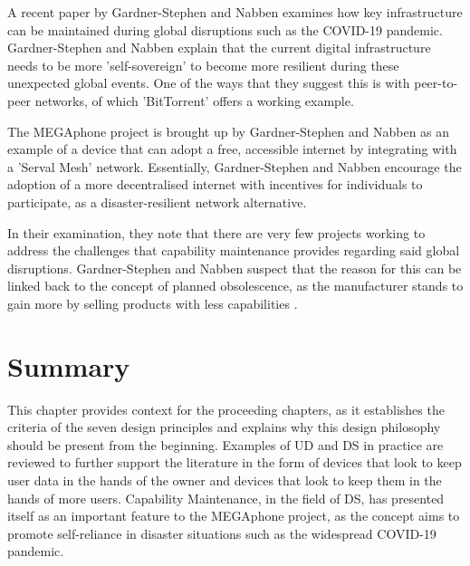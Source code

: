 A recent paper by Gardner-Stephen and Nabben \cite{capability} examines how key infrastructure can be maintained during global disruptions such as the COVID-19 pandemic.
Gardner-Stephen and Nabben explain that the current digital infrastructure needs to be more 'self-sovereign' to become more resilient during these unexpected global events.
One of the ways that they suggest this is with peer-to-peer networks, of which 'BitTorrent' offers a working example.

The MEGAphone project is brought up by Gardner-Stephen and Nabben as an example of a device that can adopt a free, accessible internet by integrating with a 'Serval Mesh' \cite{serval} network.
Essentially, Gardner-Stephen and Nabben encourage the adoption of a more decentralised internet with incentives for individuals to participate, as a disaster-resilient network alternative.

In their examination, they note that there are very few projects working to address the challenges that capability maintenance provides regarding said global disruptions.
Gardner-Stephen and Nabben suspect that the reason for this can be linked back to the concept of planned obsolescence, as the manufacturer stands to gain more by selling products with less capabilities \cite{obsolescence2}.


\section{Summary}
This chapter provides context for the proceeding chapters, as it establishes the criteria of the seven design principles and explains why this design philosophy should be present from the beginning.
Examples of UD and DS in practice are reviewed to further support the literature in the form of devices that look to keep user data in the hands of the owner and devices that look to keep them in the hands of more users.
Capability Maintenance, in the field of DS, has presented itself as an important feature to the MEGAphone project, as the concept aims to promote self-reliance in disaster situations such as the widespread COVID-19 pandemic.
